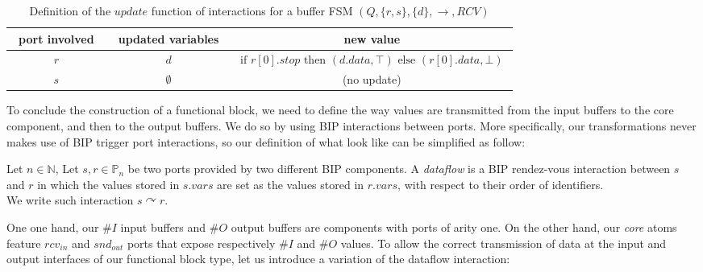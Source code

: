 \documentclass[runningheads]{llncs}
\begin{document}
\begin{table}
    \centering
    \begin{tabular}{|c|c|c|}
        \hline
        ~port involved~ &~updated variables~&~new value~\\
        \hline
        $r$ & $d$           & $\text{~if~} r[0].stop \text{~then~} (d.data, \top) \text{ else } (r[0].data, \bot) \text{~}$\\
        $s$ & $\emptyset $  & (no update)\\
        \hline
    \end{tabular}
    \caption{Definition of the $update$ function of interactions for a buffer FSM $(Q, \{r,s\}, \{d\},\rightarrow,RCV)$}\label{tab:BufferInteractions}
\end{table}

To conclude the construction of a functional block, we need to define the way values are transmitted from the input buffers to the core component, and then to the output buffers. We do so by using BIP interactions between ports. More specifically, our transformations never makes use of BIP trigger port interactions, so our definition of what look like can be simplified as follow:
\begin{definition}\label{def:DataflowInteraction}
    Let $n\in \mathbb{N}$, Let $s,r \in \mathbb{P}_n$ be two ports provided by two different BIP components. A \emph{dataflow} is a BIP rendez-vous interaction between $s$ and $r$ in which the values stored in $s.vars$ are set as the values stored in $r.vars$, with respect to their order of identifiers.\\
    We write such interaction $s\curvearrowright r$.
\end{definition}

One one hand, our $\#I$ input buffers and $\#O$ output buffers are components with ports of arity one. On the other hand, our \emph{core} atoms feature $rcv_{in}$ and $snd_{out}$ ports that expose respectively $\#I$ and $\#O$ values. To allow the correct transmission of data at the input and output interfaces of our functional block type, let us introduce a variation of the dataflow interaction:
\end{document}
